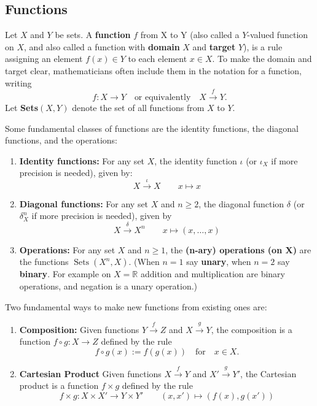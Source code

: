 \documentclass[12pt]{amsart}
\numberwithin{equation}{section}
\newcommand\Rb{{\mathbb R}} %
\newcommand{\diag}{\delta}
\newcommand{\id}{\iota}
\newcommand{\To}{\longrightarrow}
\newcommand{\mTo}{\longmapsto}
\newcommand{\Tof}[1]{\stackrel{#1}{\!\longrightarrow\!}}
\DeclareMathOperator{\Sets}{Sets}
\begin{document}
\subsection{Functions} Let $X$ and $Y$ be sets.  A \textbf{function} $f$ from X to Y (also called a $Y$-valued function on $X$, and also called a function with \textbf{domain} $X$ and \textbf{target} $Y$), is a rule assigning an element $f(x)\in Y$ to each element $x\in X$.  To make the domain and target clear, mathematicians often include them in the notation for a function, writing
 \[f:X\To Y\quad\text{or equivalently}\quad X\Tof{f}Y.\]
Let \textbf{Sets}$(X,Y)$ denote the set of all functions from $X$ to $Y$.

Some fundamental classes of functions are the identity functions, the diagonal functions, and the operations:
\begin{enumerate}
\item \textbf{Identity functions:} For any set $X$, the identity function $\id$ (or $\id_X$ if more precision is needed), given by:
 \[   X\Tof{\id}X \qquad x\mTo x   \]
 \item \textbf{Diagonal functions:} For any set $X$ and $n\geq 2$, the diagonal function $\diag$ (or $\diag_X^n$ if more precision is needed), given by
 \[   X\Tof{\diag}X^n \qquad x\mTo (x,\dots,x)   \]
 \item \textbf{Operations:} For any set $X$ and $n\geq 1$, the \textbf{(n-ary) operations (on X)} are the functions $\Sets(X^n,X)$.  (When $n=1$ say \textbf{unary}, when $n=2$ say \textbf{binary}.  For example on $X=\Rb$ addition and multiplication are binary operations, and negation is a unary operation.)
\end{enumerate}

Two fundamental ways to make new functions from existing ones are:
\begin{enumerate}
\item \textbf{Composition:} Given functions $Y\Tof{f} Z$ and $X\Tof{g} Y$, the composition is a function $f\circ g:X\To Z$ defined by the rule
 \[f\circ g(x) := f(g(x)) \quad\text{for}\quad x\in X.\]
 \item \textbf{Cartesian Product} Given functions $X\Tof{f} Y$ and $X'\Tof{g} Y'$, the Cartesian product is a function $f\times g$ defined by the rule
 \[f\times g:X\times X' \To Y\times Y' \qquad (x,x')\mTo (f(x),g(x'))\]
\end{enumerate}
\end{document}
